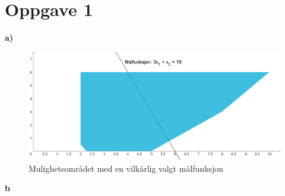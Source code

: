 \documentclass{article}
\begin{document}
    

    \captionsetup[figure]{labelformat=empty}

        
    \section*{\textbf{Oppgave 1}}
    \vspace*{12pt}\small\textbf{a)}
    \begin{figure}[ht]
        \centering
        \includegraphics*[width=\textwidth]{img/1a.PNG}
        \caption{Mulighetsområdet med en vilkårlig valgt målfunksjon}
    \end{figure}
    
    \vspace*{12pt}\small\textbf{b}
    
    

                
    
    

                
\end{document}
